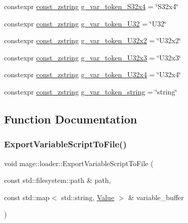 \begin{DoxyCompactItemize}
\item 
constexpr \mbox{\hyperlink{namespacemage_abfd9206dc607ceb5d13ec68bf075a5c0}{const\+\_\+zstring}} \mbox{\hyperlink{namespacemage_1_1loader_ab3a474b239881e031ea4616842329f89}{g\+\_\+var\+\_\+token\+\_\+\+S32x4}} = \char`\"{}S32x4\char`\"{}
\item 
constexpr \mbox{\hyperlink{namespacemage_abfd9206dc607ceb5d13ec68bf075a5c0}{const\+\_\+zstring}} \mbox{\hyperlink{namespacemage_1_1loader_a63dac2aaefab35621db772dad6395eb6}{g\+\_\+var\+\_\+token\+\_\+\+U32}} = \char`\"{}U32\char`\"{}
\item 
constexpr \mbox{\hyperlink{namespacemage_abfd9206dc607ceb5d13ec68bf075a5c0}{const\+\_\+zstring}} \mbox{\hyperlink{namespacemage_1_1loader_ac34c8d227f509ee37fb9f4a09efc70c7}{g\+\_\+var\+\_\+token\+\_\+\+U32x2}} = \char`\"{}U32x2\char`\"{}
\item 
constexpr \mbox{\hyperlink{namespacemage_abfd9206dc607ceb5d13ec68bf075a5c0}{const\+\_\+zstring}} \mbox{\hyperlink{namespacemage_1_1loader_acc60bccde83541a750b81771ec74276e}{g\+\_\+var\+\_\+token\+\_\+\+U32x3}} = \char`\"{}U32x3\char`\"{}
\item 
constexpr \mbox{\hyperlink{namespacemage_abfd9206dc607ceb5d13ec68bf075a5c0}{const\+\_\+zstring}} \mbox{\hyperlink{namespacemage_1_1loader_ae83a00a2c31d561dfc1772e8de001531}{g\+\_\+var\+\_\+token\+\_\+\+U32x4}} = \char`\"{}U32x4\char`\"{}
\item 
constexpr \mbox{\hyperlink{namespacemage_abfd9206dc607ceb5d13ec68bf075a5c0}{const\+\_\+zstring}} \mbox{\hyperlink{namespacemage_1_1loader_a653c16a1fffe8a8f00cc11923d6243a8}{g\+\_\+var\+\_\+token\+\_\+string}} = \char`\"{}string\char`\"{}
\end{DoxyCompactItemize}


\subsection{Function Documentation}
\mbox{\label{namespacemage_1_1loader_a7a50ce12e6a17de1f5db8d59ced5bc0f}} 
\subsubsection{\texorpdfstring{Export\+Variable\+Script\+To\+File()}{ExportVariableScriptToFile()}}
{\footnotesize\ttfamily void mage\+::loader\+::\+Export\+Variable\+Script\+To\+File (\begin{DoxyParamCaption}\item[{const std\+::filesystem\+::path \&}]{path,  }\item[{const std\+::map$<$ std\+::string, \mbox{\hyperlink{namespacemage_a68ae02d3a746ed2f285aa2b10f131a21}{Value}} $>$ \&}]{variable\+\_\+buffer }\end{DoxyParamCaption})}

